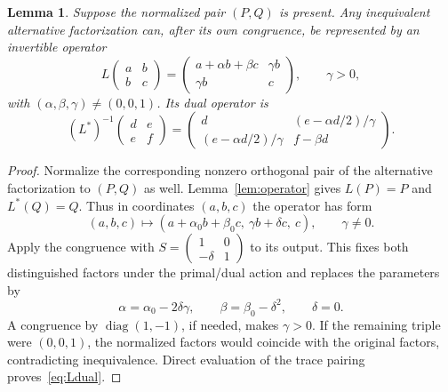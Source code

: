 \documentclass[11pt]{article}
\newtheorem{lemma}[theorem]{Lemma}
\begin{document}
\begin{lemma}\label{lem:normal}
Suppose the normalized pair $(P,Q)$ is present. Any inequivalent alternative factorization can, after its own congruence, be represented by an invertible operator
\begin{equation}\label{eq:L}
 L\begin{pmatrix}a&b\\b&c\end{pmatrix}
 =\begin{pmatrix}a+\alpha b+\beta c&\gamma b\\\gamma b&c\end{pmatrix},
 \qquad \gamma>0,
\end{equation}
with $(\alpha,\beta,\gamma)\ne(0,0,1)$.
Its dual operator is
\begin{equation}\label{eq:Ldual}
 (L^*)^{-1}\begin{pmatrix}d&e\\e&f\end{pmatrix}
 =\begin{pmatrix}d&(e-\alpha d/2)/\gamma\\
 (e-\alpha d/2)/\gamma&f-\beta d\end{pmatrix}.
\end{equation}
\end{lemma}
\begin{proof}
Normalize the corresponding nonzero orthogonal pair of the alternative factorization to $(P,Q)$ as well. Lemma~\ref{lem:operator} gives $L(P)=P$ and $L^*(Q)=Q$. Thus in coordinates $(a,b,c)$ the operator has form
\[
 (a,b,c)\mapsto(a+\alpha_0b+\beta_0c,\ \gamma b+\delta c,\ c),
 \qquad \gamma\ne0.
\]
Apply the congruence with $S=\left(\begin{smallmatrix}1&0\\-\delta&1\end{smallmatrix}\right)$ to its output. This fixes both distinguished factors under the primal/dual action and replaces the parameters by
\[
 \alpha=\alpha_0-2\delta\gamma,\qquad
 \beta=\beta_0-\delta^2,\qquad \delta=0.
\]
A congruence by $\operatorname{diag}(1,-1)$, if needed, makes $\gamma>0$. If the remaining triple were $(0,0,1)$, the normalized factors would coincide with the original factors, contradicting inequivalence. Direct evaluation of the trace pairing proves~\eqref{eq:Ldual}.
\end{proof}
\end{document}
